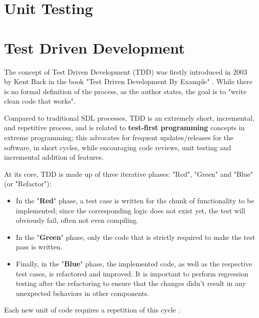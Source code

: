 \section{Unit Testing}



\section{Test Driven Development}
The concept of Test Driven Development (TDD) was firstly introduced in 2003 by Kent Back in the book "Test Driven Development By Example" \cite{TDDByExample}. While there is no formal definition of the process, as the author states, the goal is to "write clean code that works".

Compared to traditional SDL processes, TDD is an extremely short, incremental, and repetitive process, and is related to \textbf{test-first programming} concepts in extreme programming; this advocates for frequent updates/releases for the software, in short cycles, while encouraging code reviews, unit testing and incremental addition of features.


At its core, TDD is made up of three iterative phases: "Red", "Green" and "Blue" (or "Refactor"):
\begin{itemize}
    \item In the "\textbf{Red}" phase, a test case is written for the chunk of functionality to be implemented; since the corresponding logic does not exist yet, the test will obviously fail, often not even compiling.
    \item In the "\textbf{Green}" phase, only the code that is strictly required to make the test pass is written.
    \item Finally, in the "\textbf{Blue}" phase, the implemented code, as well as the respective test cases, is refactored and improved. It is important to perform regression testing after the refactoring to ensure that the changes didn't result in any unexpected behaviors in other components.
\end{itemize}
Each new unit of code requires a repetition of this cycle \cite{GuidelinesTDD}.

